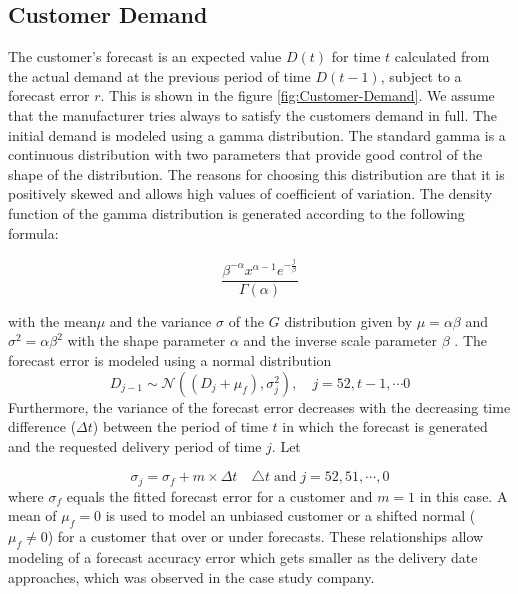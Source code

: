 \documentclass[12pt,english]{article}
\begin{document}
\subsection{Customer Demand}

The customer\textquoteright s forecast is an expected value $D(t)$
for time $t$ calculated from the actual demand at the previous period
of time $D(t-1)$, subject to a forecast error $r$. This is shown
in the figure \ref{fig:Customer-Demand}. We assume that the manufacturer
tries always to satisfy the customers demand in full. The initial
demand is modeled using a gamma distribution. The standard gamma is
a continuous distribution with two parameters that provide good control
of the shape of the distribution. The reasons for choosing this distribution
are that it is positively skewed and allows high values of coefficient
of variation. The density function of the gamma distribution is generated
according to the following formula:

\begin{equation}
\frac{\beta^{-\alpha}x^{\alpha-1}e^{-\frac{j}{\beta}}}{\Gamma(\alpha)}\label{eq:equation4}
\end{equation}


with the mean$\mu$ and the variance $\sigma$ of the $G$ distribution
given by $\mu=\alpha\beta$ and $\sigma^{2}=\alpha\beta^{2}$ with
the shape parameter $\alpha$ and the inverse scale parameter $\beta$
. The forecast error is modeled using a normal distribution 
\begin{equation}
D_{j-1}\sim\mathcal{N}\left(\left(D_{j}+\mu_{f}\right),\sigma_{j}^{2}\right),\quad j=52,t-1,\cdots0\label{eq:normal}
\end{equation}
Furthermore, the variance of the forecast error decreases with the
decreasing time difference ($\Delta t$) between the period of time
$t$ in which the forecast is generated and the requested delivery
period of time $j$. Let 


\begin{equation}
\sigma_{j}=\sigma_{f}+m\times\Delta t\quad\triangle t{\textstyle \;{\textstyle \textrm{and}}}\; j=52,51,\cdots,0\label{eq:Variance}
\end{equation}
where $\sigma_{f}$ equals the fitted forecast error for a customer
and $m=1$ in this case. A mean of $\mu_{f}=0$ is used to model an
unbiased customer or a shifted normal ($\mu_{f}\neq0$) for a customer
that over or under forecasts. These relationships allow modeling of
a forecast accuracy error which gets smaller as the delivery date
approaches, which was observed in the case study company. 
\end{document}
